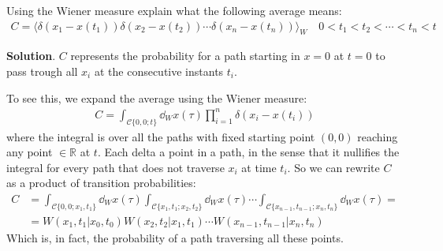 \documentclass[../template.tex]{subfiles}
\begin{document}
\begin{exo}
    Using the Wiener measure explain what the following average means:
    \begin{align*}
       C= \langle \delta(x_1 - x(t_1)) \delta(x_2 - x(t_2)) \cdots \delta(x_n - x(t_n)) \rangle_W \quad 0<t_1 <t_2 < \cdots < t_n < t
    \end{align*}

    \medskip

    \textbf{Solution}. $C$ represents the probability for a path starting in $x=0$ at $t=0$ to pass trough all $x_i$ at the consecutive instants $t_i$.

    To see this, we expand the average using the Wiener measure:
    \begin{align*}
        C = \int_{\mathcal{C}\{0,0;t\}} \dd{_Wx(\tau)} \prod_{i=1}^n\delta(x_i-x(t_i)) 
    \end{align*} 
    where the integral is over all the paths with fixed starting point $(0,0)$ reaching any point $\in \mathbb{R}$ at $t$. Each delta  a point in a path, in the sense that it nullifies the integral for every path that does not traverse $x_i$ at time $t_i$. So we can rewrite $C$ as a product of transition probabilities:
    \begin{align*}
        C&=\int_{\mathcal{C}\{0,0;x_1,t_1\}} \dd{_Wx(\tau)} \int_{\mathcal{C}\{x_1,t_1;x_2,t_2\}} \dd{_Wx(\tau)} \cdots \int_{\mathcal{C}\{x_{n-1},t_{n-1};x_n,t_n\}}\dd{_Wx(\tau)} =\\
        &= W(x_1,t_1|x_0,t_0) W(x_2,t_2|x_1,t_1) \cdots W(x_{n-1},t_{n-1}|x_n,t_n)
    \end{align*}
    Which is, in fact, the probability of a path traversing all these points.
\end{exo}
\end{document}

